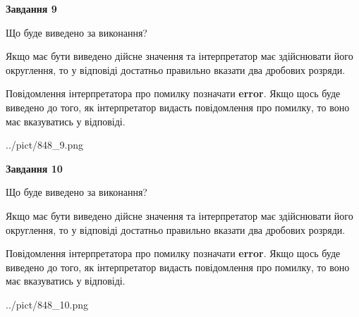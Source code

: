 \documentclass[12pt, ukrainian]{article}
\begin{document}
{\begin {Large}
{\begin {center}\textbf{Завдання 9}\end {center}}\par
Що буде виведено за виконання? \par

Якщо має бути виведено дійсне значення та інтерпретатор має здійснювати його округлення, 
то у відповіді достатньо правильно вказати два дробових розряди.

Повідомлення інтерпретатора про помилку позначати \textbf{error}.
Якщо щось буде виведено до того, як інтерпретатор видасть повідомлення про помилку, 
то воно має вказуватись у відповіді. \par

\begin{center}
	{../pict/848_9.png}
\end{center}
\newpage

{\begin {center}\textbf{Завдання 10}\end {center}}\par
Що буде виведено за виконання? \par

Якщо має бути виведено дійсне значення та інтерпретатор має здійснювати його округлення, 
то у відповіді достатньо правильно вказати два дробових розряди.

Повідомлення інтерпретатора про помилку позначати \textbf{error}.
Якщо щось буде виведено до того, як інтерпретатор видасть повідомлення про помилку, 
то воно має вказуватись у відповіді. \par

\begin{center}
	{../pict/848_10.png}
\end{center}
\newpage

\end {Large}}
\end{document}
